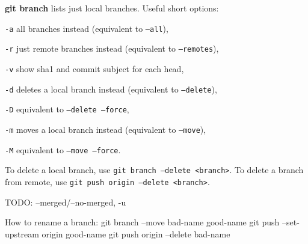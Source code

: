 %

\textbf{git branch} lists just local branches.
Useful short options:
\begin{compactenum}
\item [\texttt{-a}] all branches instead (equivalent to \texttt{--all}),
\item [\texttt{-r}] just remote branches instead (equivalent to \texttt{--remotes}),
\item [\texttt{-v}] show sha1 and commit subject for each head,
\item [\texttt{-d}] deletes a local branch instead (equivalent to \texttt{--delete}),
\item [\texttt{-D}] equivalent to \texttt{--delete --force},
\item [\texttt{-m}] moves a local branch instead (equivalent to \texttt{--move}),
\item [\texttt{-M}] equivalent to \texttt{--move --force}.
\end{compactenum}

To delete a local branch, use \texttt{git branch --delete <branch>}.
To delete a branch from remote, use \texttt{git push origin --delete <branch>}.

TODO: --merged/--no-merged, -u

How to rename a branch:
git branch --move bad-name good-name
git push --set-upstream origin good-name
git push origin --delete bad-name

%